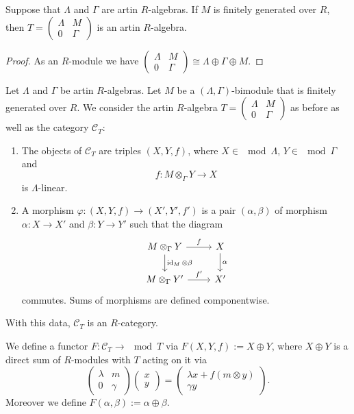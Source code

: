 \begin{lemma}
Suppose that $\Lambda$ and $\Gamma$ are artin $R$-algebras. If $M$ is finitely generated over $R$, then
$
T =
\left(\begin{smallmatrix}
\Lambda & M\\
0 & \Gamma
\end{smallmatrix} \right)
$
is an artin $R$-algebra.
\end{lemma}


\begin{proof}
As an $R$-module we have
$
\left(\begin{smallmatrix}
\Lambda & M\\
0 & \Gamma
\end{smallmatrix} \right)
\cong
\Lambda\oplus\Gamma\oplus M
$.
\end{proof}


Let $\Lambda$ and $\Gamma$ be artin $R$-algebras. Let $M$ be a $(\Lambda,\Gamma)$-bimodule that is finitely generated over $R$. We consider the artin $R$-algebra
$
T =
\left(\begin{smallmatrix}
\Lambda & M\\
0 & \Gamma
\end{smallmatrix} \right)
$
as before as well as the category $\mathcal{C}_T$:
\begin{enumerate}[label=(\roman*)]
\item The objects of $\mathcal{C}_T$ are triples $(X,Y,f)$, where $X\in\mod\Lambda$, $Y\in\mod\Gamma$ and
\[
f:M\otimes_\Gamma Y \to X
\]
is $\Lambda$-linear.
\item A morphism $\varphi:(X,Y,f)\to (X',Y',f')$ is a pair $(\alpha,\beta)$ of morphism $\alpha:X\to X'$ and $\beta:Y\to Y'$ such that the diagram
\[\begin{tikzcd}
      M \otimes_\Gamma Y \dar["\id_M \otimes \beta"] \rar["f"] & X \ar[d, "\alpha"]\\
      M \otimes_\Gamma Y' \rar["f'"] & X'
          \end{tikzcd}
\]
commutes. Sums of morphisms are defined componentwise.
\end{enumerate}
%
With this data, $\mathcal{C}_T$ is an $R$-category.

We define a functor $F:\mathcal{C}_T\to\mod T$ via $F(X,Y,f):=X\oplus Y$, where $X\oplus Y$ is a direct sum of $R$-modules with $T$ acting on it via
\[
\begin{pmatrix}
\lambda & m\\
0 & \gamma
\end{pmatrix}
\begin{pmatrix}
x \\ y
\end{pmatrix}
=
\begin{pmatrix}
\lambda x + f(m\otimes y) \\ \gamma y
\end{pmatrix}.
\]
Moreover we define $F(\alpha,\beta):=\alpha\oplus\beta$.

